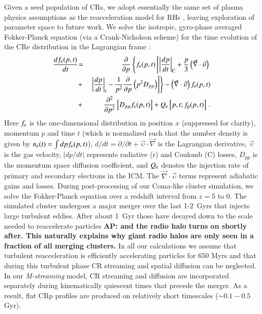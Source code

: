 \documentclass[useAMS,usenatbib]{mn2e}
\newcommand{\Mstream}{{\it M-streaming}\xspace}
\def\AP#1{{\bf  AP: #1}}
\begin{document}
Given a seed population of CRs, we adopt essentially the same set of
plasma physics assumptions as the reacceleration model for RHs
\citep{brunetti07,brunetti11}, leaving exploration of parameter space
to future work. We solve the isotropic, gyro-phase averaged
Fokker-Planck equation (via a Crank-Nicholson scheme) for the time
evolution of the CRe distribution in the Lagrangian frame
\citep{brunetti07,brunetti11}:
\begin{eqnarray}
{{d f_{{\mathrm{e}}}(p,t)}\over{d t}} &\!=&
\frac{\partial}{\partial p}
\left\{
f_{{\mathrm{e}}}(p,t)\left[
\left|{{dp}\over{dt}}\right|_{\rm C} 
+ \frac{p}{3}\left(\vec{\nabla}\cdot \vec{\upsilon}\right)\right.\right.
\nonumber\\
&+& \left.\left. \left|{{dp}\over{dt}}\right|_{\rm r}
- {1\over{p^2}}{{\partial }\over{\partial p}}\left(p^2 D_{pp}\right) 
\right]\right\} - \left(\vec{\nabla}\cdot \vec{\upsilon}\right) f_{{\mathrm{e}}}(p,t)
\nonumber\\
&+& {{\partial^2 }\over{\partial p^2}}
\left[
D_{pp} f_{{\mathrm{e}}}(p,t) \right]+ Q_{{\mathrm{e}}}\left[p,t;f_{{\mathrm{p}}}(p,t)\right]   \, .
\label{elettroni}
\end{eqnarray}
Here $f_{{\mathrm{e}}}$ is the one-dimensional distribution in position $x$
(suppressed for clarity), momentum $p$ and time $t$ (which is
normalized such that the number density is given by
$n_{{\mathrm{e}}}(t)=\int d p f_{{\mathrm{e}}}(p,t)$), $d/dt=\partial/\partial
t+\vec{\upsilon}\cdot \vec{\nabla}$ is the Lagrangian derivative,
$\vec{\upsilon}$ is the gas velocity, $|dp/dt|$ represents radiative
(r) and Coulomb (C) losses, $D_{pp}$ is the momentum space diffusion
coefficient, and $Q_{{\mathrm{e}}}$ denotes the injection rate of primary
and secondary electrons in the ICM. The $\vec{\nabla}\cdot
\vec{\upsilon}$ terms represent adiabatic gains and losses. During
post-processing of our Coma-like cluster simulation, we solve the
Fokker-Planck equation over a redshift interval from $z=5$ to 0. The
simulated cluster undergoes a major merger over the last 1-2~Gyrs that
injects large turbulent eddies. After about 1~Gyr those have decayed
down to the scale needed to reaccelerate particles \AP{and the radio
  halo turns on shortly after. This naturally explains why giant radio
  halos are only seen in a fraction of all merging clusters.} In all
our calculations we assume that turbulent reacceleration is
efficiently accelerating particles for 650 Myrs and that during this
turbulent phase CR streaming and spatial diffusion can be
neglected. In our \Mstream model, CR streaming and diffusion are
incorporated separately during kinematically quiescent times that
precede the merger. As a result, flat CRp profiles are produced on
relatively short timescales ($\sim 0.1-0.5$ Gyr).
\end{document}
